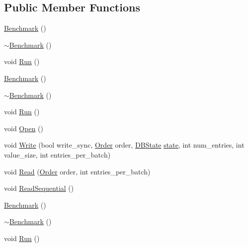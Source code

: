 \subsection*{Public Member Functions}
\begin{DoxyCompactItemize}
\item 
\hyperlink{classleveldb_1_1_benchmark_a05d001d05283f6d1d589d417b42aa736}{Benchmark} ()
\item 
\hyperlink{classleveldb_1_1_benchmark_a32bd4ebe6df5e4f664a944d71b066bd5}{$\sim$\+Benchmark} ()
\item 
void \hyperlink{classleveldb_1_1_benchmark_a2f262afa0c7d10fcf531fe9657fba490}{Run} ()
\item 
\hyperlink{classleveldb_1_1_benchmark_a05d001d05283f6d1d589d417b42aa736}{Benchmark} ()
\item 
\hyperlink{classleveldb_1_1_benchmark_a32bd4ebe6df5e4f664a944d71b066bd5}{$\sim$\+Benchmark} ()
\item 
void \hyperlink{classleveldb_1_1_benchmark_a2f262afa0c7d10fcf531fe9657fba490}{Run} ()
\item 
void \hyperlink{classleveldb_1_1_benchmark_a89a3b0da75e6cd2ffb879358e5dd82a6}{Open} ()
\item 
void \hyperlink{classleveldb_1_1_benchmark_a86876b2882d9015610330e69acfdff0d}{Write} (bool write\+\_\+sync, \hyperlink{classleveldb_1_1_benchmark_a4694fe0f2fd06d7da386305a339ddbc4}{Order} order, \hyperlink{classleveldb_1_1_benchmark_ad94bd817d74359a4d8cea6da609a28d4}{D\+B\+State} \hyperlink{version__set_8cc_a6aad002d0db5e5e85dc31927a5a6f503}{state}, int num\+\_\+entries, int value\+\_\+size, int entries\+\_\+per\+\_\+batch)
\item 
void \hyperlink{classleveldb_1_1_benchmark_afc9cf258a63488924e172fadc67c12f1}{Read} (\hyperlink{classleveldb_1_1_benchmark_a4694fe0f2fd06d7da386305a339ddbc4}{Order} order, int entries\+\_\+per\+\_\+batch)
\item 
void \hyperlink{classleveldb_1_1_benchmark_a301897d0609459c5e6072db05da6b737}{Read\+Sequential} ()
\item 
\hyperlink{classleveldb_1_1_benchmark_a05d001d05283f6d1d589d417b42aa736}{Benchmark} ()
\item 
\hyperlink{classleveldb_1_1_benchmark_a32bd4ebe6df5e4f664a944d71b066bd5}{$\sim$\+Benchmark} ()
\item 
void \hyperlink{classleveldb_1_1_benchmark_a2f262afa0c7d10fcf531fe9657fba490}{Run} ()
\end{DoxyCompactItemize}


